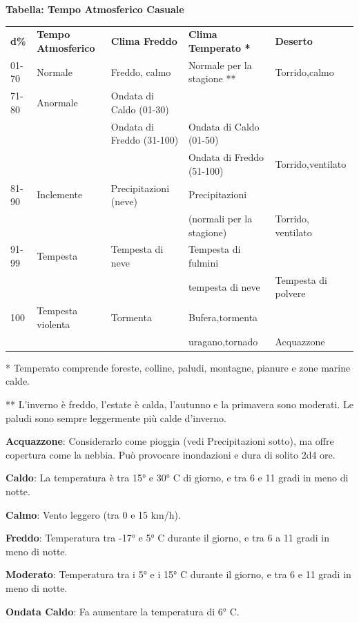 \documentclass[a4paper,11pt,twoside,openany]{book}
\begin{document}
\bigskip

\textbf{Tabella: Tempo Atmosferico Casuale}

\begin{tabularx}{0.95\textwidth}{lXXXX}
	\toprule
	\textbf{d\%} & \textbf{Tempo Atmosferico} & \textbf{Clima Freddo}& \textbf{Clima Temperato {*}}   & \textbf{Deserto}\\
	01-70   & Normale& Freddo, calmo   & Normale per la stagione {*}{*} & Torrido,calmo\\
	71-80   & Anormale    & Ondata di Caldo (01-30)   \\
	   &   & Ondata di Freddo (31-100) & Ondata di Caldo (01-50)\\
	   &   &  & Ondata di Freddo (51-100) & Torrido,ventilato\\
	81-90   & Inclemente  & Precipitazioni (neve)& Precipitazioni    \\
	   &   &  & (normali per la stagione) & Torrido, ventilato\\
	91-99   & Tempesta    & Tempesta di neve& Tempesta di fulmini    \\
	   &   &  & tempesta di neve& Tempesta di polvere\\
	100& Tempesta violenta& Tormenta   & Bufera,tormenta   \\
	   &   &  & uragano,tornado & Acquazzone\\
\end{tabularx}

* Temperato comprende foreste, colline, paludi, montagne, pianure
e zone marine calde.

** L'inverno è freddo, l'estate è calda, l'autunno e la primavera sono moderati. Le paludi sono sempre leggermente più calde d'inverno.

\bigskip

\textbf{Acquazzone}: Considerarlo come pioggia (vedi Precipitazioni sotto), ma offre copertura come la nebbia. Può provocare inondazioni e dura di solito 2d4 ore.

\textbf{Caldo}: La temperatura è tra 15° e 30° C di giorno, e tra 6 e 11 gradi in meno di notte.

\textbf{Calmo}: Vento leggero (tra 0 e 15 km/h).

\textbf{Freddo}: Temperatura tra -17° e 5° C durante il giorno, e tra 6 a 11 gradi in meno di notte.

\textbf{Moderato}: Temperatura tra i 5° e i 15° C durante il giorno, e tra 6 e 11 gradi in meno di notte.

\textbf{Ondata Caldo}: Fa aumentare la temperatura di 6° C.
\end{document}
